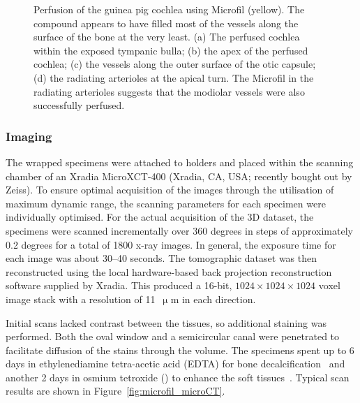 \begin{figure}
	\caption[Perfusion of the guinea pig cochlea using Microfil]{Perfusion of the
	guinea pig cochlea using Microfil (yellow). The compound appears to have filled
	most of the vessels along the surface of the bone at the very least. (a) The
	perfused cochlea within the exposed tympanic bulla; (b) the apex of the perfused
	cochlea; (c) the vessels along the outer surface of the otic capsule; (d) the
	radiating arterioles at the apical turn. The Microfil in the radiating
	arterioles suggests that the modiolar vessels were also successfully perfused.}
	\label{fig:microfil_perfusion}
\end{figure}

\subsubsection{Imaging}

The wrapped specimens were attached to holders and placed within the scanning
chamber of an Xradia MicroXCT-400 (Xradia, CA, USA; recently bought out by
Zeiss). To ensure optimal acquisition of the images through the utilisation of
maximum dynamic range, the scanning parameters for each specimen were
individually optimised. For the actual acquisition of the 3D dataset, the
specimens were scanned incrementally over 360 degrees in steps of approximately
0.2 degrees for a total of 1800 x-ray images. In general, the exposure time for
each image was about 30--40 seconds. The tomographic dataset was then
reconstructed using the local hardware-based back projection reconstruction
software supplied by Xradia. This produced a 16-bit, $ 1024 \times 1024 \times
1024 $ voxel image stack with a resolution of 11~$ \upmu $m in each direction.

Initial scans lacked contrast between the tissues, so additional staining was
performed. Both the oval window and a semicircular canal were penetrated to
facilitate diffusion of the stains through the volume. The specimens spent up to
6 days in ethylenediamine tetra-acetic acid (EDTA) for bone
decalcification~\cite{schneider2009} and another 2 days in osmium tetroxide
() to enhance the soft tissues~\cite{wong2013}. Typical scan results
are shown in Figure~\ref{fig:microfil_microCT}.

